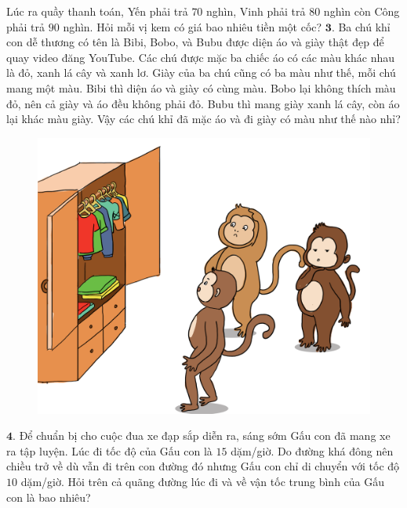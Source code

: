 \begin{multicols}{2}
\begin{figure}[H]
		\vspace*{-5pt}
	\end{figure}
	Lúc ra quầy thanh toán, Yến phải trả $70$ nghìn, Vinh phải trả $80$ nghìn còn Công phải trả $90$ nghìn. Hỏi mỗi vị kem có giá bao nhiêu tiền một cốc?
	\vskip 0.1cm
	$\pmb{3.}$ Ba chú khỉ con dễ thương có tên là Bibi, Bobo, và Bubu được diện áo và giày thật đẹp để quay video đăng YouTube. Các chú được mặc ba chiếc áo có các màu khác nhau là đỏ, xanh lá cây và xanh lơ. Giày của ba chú cũng có ba màu như thế, mỗi chú mang một màu. Bibi thì diện áo và giày có cùng màu. Bobo lại không thích màu đỏ, nên cả giày và áo đều không phải đỏ. Bubu thì mang giày xanh lá cây, còn áo lại khác màu giày. Vậy các chú khỉ đã mặc áo và đi giày có màu như thế nào nhỉ?
	\begin{figure}[H]
		\centering
		\vspace*{-5pt}
		\captionsetup{labelformat= empty, justification=centering}
		\includegraphics[width=1\linewidth]{bai3}
		\vspace*{-15pt}
	\end{figure}
	$\pmb{4.}$ Để chuẩn bị cho cuộc đua xe đạp sắp diễn ra, sáng sớm Gấu con đã mang xe ra tập luyện. Lúc đi tốc độ của Gấu con là $15$ dặm/giờ. Do đường khá đông nên chiều trở về dù vẫn đi trên con đường đó nhưng Gấu con chỉ di chuyển với tốc độ $10$ dặm/giờ. Hỏi trên cả quãng đường lúc đi và về vận tốc trung bình của Gấu con là bao nhiêu?
	\begin{figure}[H]
		\centering
		\vspace*{-5pt}

\end{figure}
\end{multicols}
